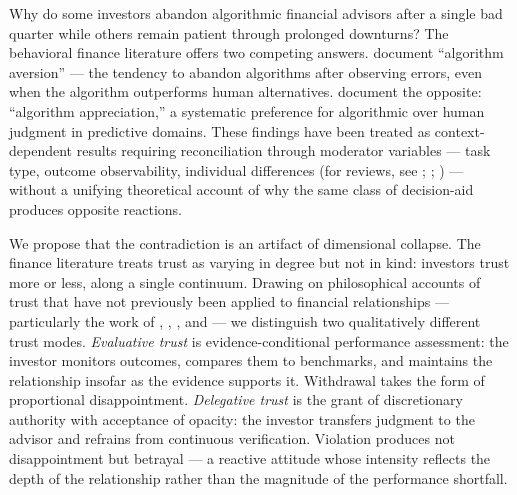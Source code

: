 
Why do some investors abandon algorithmic financial advisors after a single bad quarter while others remain patient through prolonged downturns? The behavioral finance literature offers two competing answers. \citet{DietvorstSimmonsMassey2015} document ``algorithm aversion'' --- the tendency to abandon algorithms after observing errors, even when the algorithm outperforms human alternatives. \citet{LoggMinsonMoore2019} document the opposite: ``algorithm appreciation,'' a systematic preference for algorithmic over human judgment in predictive domains. These findings have been treated as context-dependent results requiring reconciliation through moderator variables --- task type, outcome observability, individual differences (for reviews, see \citealt{BurtonSteinJensen2020}; \citealt{MahmudIslamEtAl2022}; \citealt{JussupowBenbasatHeinzl2024}) --- without a unifying theoretical account of why the same class of decision-aid produces opposite reactions.

We propose that the contradiction is an artifact of dimensional collapse. The finance literature treats trust as varying in degree but not in kind: investors trust more or less, along a single continuum. Drawing on philosophical accounts of trust that have not previously been applied to financial relationships --- particularly the work of \citet{Baier1986}, \citet{Holton1994}, \citet{Nickel2012}, and \citet{Hawley2014} --- we distinguish two qualitatively different trust modes. \textit{Evaluative trust} is evidence-conditional performance assessment: the investor monitors outcomes, compares them to benchmarks, and maintains the relationship insofar as the evidence supports it. Withdrawal takes the form of proportional disappointment. \textit{Delegative trust} is the grant of discretionary authority with acceptance of opacity: the investor transfers judgment to the advisor and refrains from continuous verification. Violation produces not disappointment but betrayal --- a reactive attitude whose intensity reflects the depth of the relationship rather than the magnitude of the performance shortfall.

